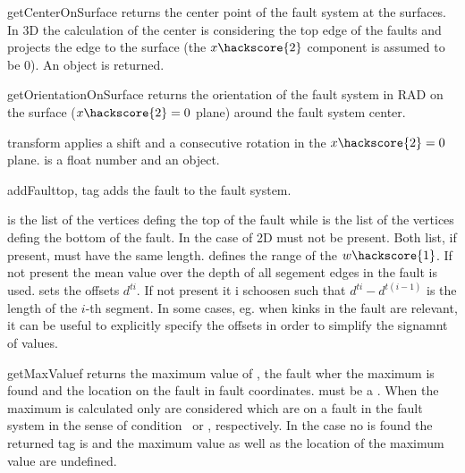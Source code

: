 \begin{methoddesc}[FaultSystem]{getCenterOnSurface}{}
returns the center point of the fault system at the surfaces. In 3D the calculation of the center is
considering the top edge of the faults and projects the edge to the surface (the $x\hackscore{2}$ component is assumed to be 0). An \numpyNDA object is returned.
\end{methoddesc}

\begin{methoddesc}[FaultSystem]{getOrientationOnSurface}{}
returns the orientation of the fault system in RAD on the surface ($x\hackscore{2}=0$ plane) around the fault system center.
\end{methoddesc}
\begin{methoddesc}[FaultSystem]{transform}{}
applies a shift  and a consecutive rotation in the $x\hackscore{2}=0$ plane.
 is a float number and  an \numpyNDA object.
\end{methoddesc}

\begin{methoddesc}[FaultSystem]{addFault}{top, tag }
adds the  fault  to the fault system. 

 is the list of the vertices defing the top of the fault
while  is the list of the vertices defing the bottom of the fault.
In the case of 2D  must not be present. Both list, if present, must have the same length.
 defines the range of the $w\hackscore{1}$. If not present the mean value over the depth of 
all segement edges in the fault is used.
 sets the offsets $d^{ti}$. If not present it i schoosen such that $d^{ti}-d^{t(i-1)}$ is the length of the $i$-th segment. In some cases, eg. when kinks in the fault are relevant, it can be useful
to explicitly specify the offsets in order to simplify the signamnt of values.
\end{methoddesc}

\begin{methoddesc}[FaultSystem]{getMaxValue}{f}
returns the maximum value of , the fault wher the maximum is found and the location on the fault in fault coordinates.  must be a \Scalar. When the maximum is calculated only \DataSamplePoints are considered
which are on a fault in the fault system in the sense of condition~\label{eq:2D line 3} or \label{eq:3D line 3}, respectively. In the case no \DataSamplePoints is found the returned tag is  and
the maximum value as well as the location of the maximum value are undefined.
\end{methoddesc}

